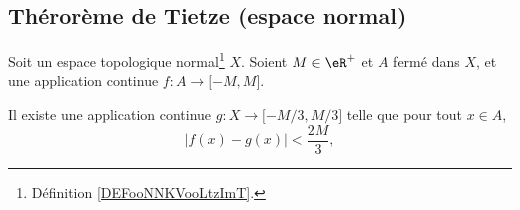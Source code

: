 

\subsection{Thérorème de Tietze (espace normal)}

\begin{lemma}     \label{LEMooCLVAooTaNGJk}
    Soit un espace topologique normal\footnote{Définition \ref{DEFooNNKVooLtzImT}.} \( X\). Soient \( M\in \eR^+\) et \( A\) fermé dans \( X\), et une application continue \( f\colon A\to \mathopen[ -M , M \mathclose]\).

    Il existe une application continue \( g\colon X\to \mathopen[ -M/3 , M/3 \mathclose]\) telle que pour tout \( x\in A\),
            \begin{equation}
                | f(x)-g(x) |<\frac{ 2M }{ 3 },
            \end{equation}
\end{lemma}

